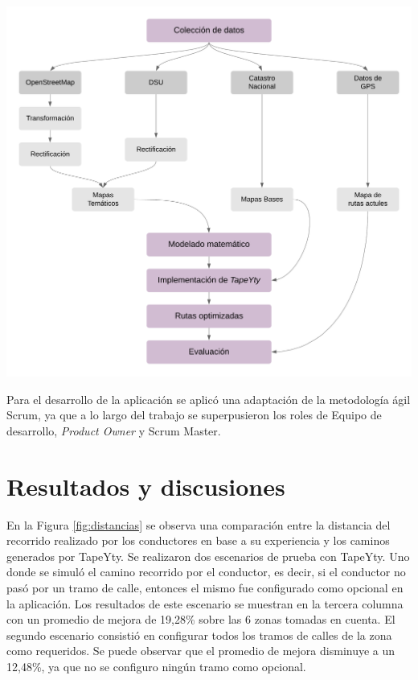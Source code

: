 \documentclass[a0,portrait, final]{a0poster}
\begin{document}
\begin{multicols}{2}
\begin{center}
\includegraphics[scale=1.5]{./figures/DiagramaDeMetodologia.png}
    \label{fig:metodologia}
\end{center}


Para el desarrollo de la aplicación se aplicó una adaptación de la metodología ágil Scrum, ya que a lo largo del trabajo se superpusieron los roles de Equipo de desarrollo, \textit{Product Owner} y Scrum Master.
\section*{Resultados y discusiones}

En la Figura \ref{fig:distancias} se observa una comparación entre la distancia del recorrido realizado por los conductores en base a su experiencia y los caminos generados por TapeYty. Se realizaron dos escenarios de prueba con TapeYty. Uno donde se simuló el camino recorrido por el conductor, es decir, si el conductor no pasó por un tramo de calle, entonces el mismo fue configurado como opcional en la aplicación. Los resultados de este escenario se muestran en la tercera columna con un promedio de mejora de 19,28\% sobre las 6 zonas tomadas en cuenta.
El segundo escenario consistió en configurar todos los tramos de calles de la zona como requeridos. Se puede observar que el promedio de mejora disminuye a un 12,48\%, ya que no se configuro ningún tramo como opcional.


\end{multicols}
\end{document}
